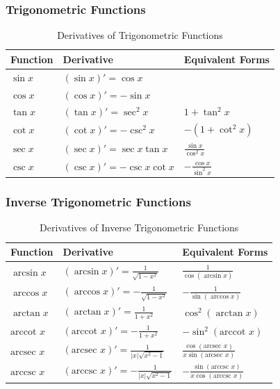 \subsubsection{Trigonometric Functions}

\begin{table}[H]
\centering
\begin{tabular}{@{}lll@{}}
\toprule
Function & Derivative & Equivalent Forms \\
\midrule
$\sin x$ & $(\sin x)' = \cos x$ & \\
$\cos x$ & $(\cos x)' = -\sin x$ & \\
$\tan x$ & $(\tan x)' = \sec^2 x$ & $1 + \tan^2 x$ \\
$\cot x$ & $(\cot x)' = -\csc^2 x$ & $-(1 + \cot^2 x)$ \\
$\sec x$ & $(\sec x)' = \sec x \tan x$ & $\frac{\sin x}{\cos^2 x}$ \\
$\csc x$ & $(\csc x)' = -\csc x \cot x$ & $-\frac{\cos x}{\sin^2 x}$ \\
\bottomrule
\end{tabular}
\caption{Derivatives of Trigonometric Functions}
\label{tab:trig_derivatives}
\end{table}

\subsubsection{Inverse Trigonometric Functions}

\begin{table}[H]
\centering
\begin{tabular}{@{}lll@{}}
\toprule
Function & Derivative & Equivalent Forms \\
\midrule
$\arcsin x$ & $(\arcsin x)' = \frac{1}{\sqrt{1-x^2}}$ & $\frac{1}{\cos(\arcsin x)}$ \\
$\arccos x$ & $(\arccos x)' = -\frac{1}{\sqrt{1-x^2}}$ & $-\frac{1}{\sin(\arccos x)}$ \\
$\arctan x$ & $(\arctan x)' = \frac{1}{1+x^2}$ & $\cos^2(\arctan x)$ \\
$\text{arccot } x$ & $(\text{arccot } x)' = -\frac{1}{1+x^2}$ & $-\sin^2(\text{arccot } x)$ \\
$\text{arcsec } x$ & $(\text{arcsec } x)' = \frac{1}{|x|\sqrt{x^2-1}}$ & $\frac{\cos(\text{arcsec } x)}{x\sin(\text{arcsec } x)}$ \\
$\text{arccsc } x$ & $(\text{arccsc } x)' = -\frac{1}{|x|\sqrt{x^2-1}}$ & $-\frac{\sin(\text{arccsc } x)}{x\cos(\text{arccsc } x)}$ \\
\bottomrule
\end{tabular}
\caption{Derivatives of Inverse Trigonometric Functions}
\label{tab:inverse_trig_derivatives}
\end{table}

